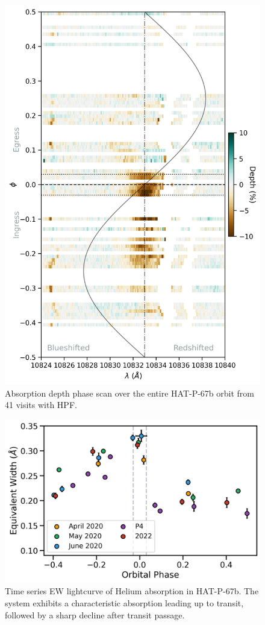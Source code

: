 \documentclass[twocolumn]{aastex631}
\begin{document}
\begin{figure}
    \includegraphics[width=\linewidth]{figures/phase_2D_diagram_resid.png}
    \caption{Absorption depth phase scan over the entire HAT-P-67b orbit from 41 visits with HPF.  }
    \label{fig:HPFscanResid}
\end{figure}


\begin{figure}
    \includegraphics[width=\linewidth]{figures/HAT_P_67b_Helium10830EW_byCampaign.png}
    \caption{Time series EW lightcurve of Helium absorption in HAT-P-67b.  The system exhibits a characteristic absorption leading up to transit, followed by a sharp decline after transit passage.  }
    \label{fig:HPFtimeseries}
\end{figure}
\end{document}
